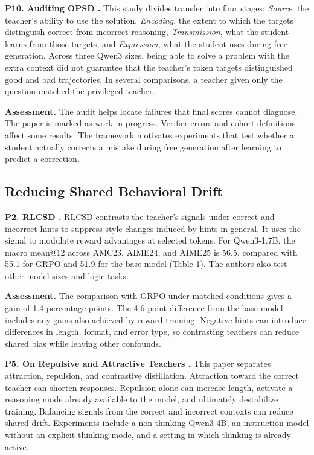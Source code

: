 \documentclass[11pt,a4paper]{article}
\begin{document}
\textbf{P10. Auditing OPSD \cite{p10}.} This study divides transfer into four stages: \emph{Source}, the teacher's ability to use the solution, \emph{Encoding}, the extent to which the targets distinguish correct from incorrect reasoning, \emph{Transmission}, what the student learns from those targets, and \emph{Expression}, what the student uses during free generation. Across three Qwen3 sizes, being able to solve a problem with the extra context did not guarantee that the teacher's token targets distinguished good and bad trajectories. In several comparisons, a teacher given only the question matched the privileged teacher.

\textbf{Assessment.} The audit helps locate failures that final scores cannot diagnose. The paper is marked as work in progress. Verifier errors and cohort definitions affect some results. The framework motivates experiments that test whether a student actually corrects a mistake during free generation after learning to predict a correction.

\subsection{Reducing Shared Behavioral Drift}
\textbf{P2. RLCSD \cite{p2}.} RLCSD contrasts the teacher's signals under correct and incorrect hints to suppress style changes induced by hints in general. It uses the signal to modulate reward advantages at selected tokens. For Qwen3-1.7B, the macro mean@12 across AMC23, AIME24, and AIME25 is 56.5, compared with 55.1 for GRPO and 51.9 for the base model (Table 1). The authors also test other model sizes and logic tasks.

\textbf{Assessment.} The comparison with GRPO under matched conditions gives a gain of 1.4 percentage points. The 4.6-point difference from the base model includes any gains also achieved by reward training. Negative hints can introduce differences in length, format, and error type, so contrasting teachers can reduce shared bias while leaving other confounds.

\textbf{P5. On Repulsive and Attractive Teachers \cite{p5}.} This paper separates attraction, repulsion, and contrastive distillation. Attraction toward the correct teacher can shorten responses. Repulsion alone can increase length, activate a reasoning mode already available to the model, and ultimately destabilize training. Balancing signals from the correct and incorrect contexts can reduce shared drift. Experiments include a non-thinking Qwen3-4B, an instruction model without an explicit thinking mode, and a setting in which thinking is already active.
\end{document}
